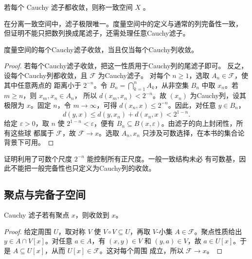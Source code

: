 \begin{definition}[完备一致空间]
若每个 Cauchy 滤子都收敛，则称一致空间 \(X\) 。
\end{definition}

在分离一致空间中，滤子极限唯一。度量空间中的定义与通常的列完备性一致，
但证明不能只把数列换成尾滤子，还需处理任意Cauchy滤子。

\begin{proposition}[度量空间的两种完备性定义]
\label{prop:metric-filter-completeness}
度量空间的每个Cauchy滤子收敛，当且仅当每个Cauchy列收敛。
\end{proposition}

\begin{proof}
若每个Cauchy滤子收敛，把这一性质用于Cauchy列的尾滤子即可。
反之，设每个Cauchy列都收敛，且 \(\mathcal F\) 为Cauchy滤子。
对每个 \(n\ge1\)，选取 \(A_n\in\mathcal F\)，使其中任意两点的
距离小于 \(2^{-n}\)。令 \(B_n=\bigcap_{k=1}^n A_k\)，从非空集
\(B_n\) 中取 \(x_n\)。若 \(m\ge n\)，则 \(x_m,x_n\in A_n\)，
所以 \(d(x_m,x_n)<2^{-n}\)。故 \((x_n)\) 为Cauchy列，设其极限为
\(x\)。固定 \(n\)，令 \(m\to\infty\)，可得
\(d(x_n,x)\le2^{-n}\)。因此，对任意 \(y\in B_n\)，
\[
 d(y,x)\le d(y,x_n)+d(x_n,x)<2^{1-n}.
\]
给定 \(\varepsilon>0\)，取 \(n\) 使 \(2^{1-n}<\varepsilon\)，便有
\(B_n\subseteq B(x,\varepsilon)\)。由滤子的向上封闭性，所有这些球
都属于 \(\mathcal F\)，故 \(\mathcal F\to x\)。选取 \(A_n,x_n\)
只涉及可数选择，在本书的集合论背景下可用。
\end{proof}

证明利用了可数个尺度 \(2^{-n}\) 能控制所有正尺度。一般一致结构未必
有可数基，因此不能把一般完备性也只定义为Cauchy列的收敛。

\subsection{聚点与完备子空间}

\begin{lemma}
\label{lem:cauchy-filter-cluster-limit}
Cauchy 滤子若有聚点 \(x\)，则收敛到 \(x\)。
\end{lemma}

\begin{proof}
给定周围 \(U\)，取对称 \(V\) 使 \(V\circ V\subseteq U\)，再取
\(V\)-小集 \(A\in\mathcal F\)。聚点性质给出
\(y\in A\cap V[x]\)。对任意 \(a\in A\)，有
\((x,y)\in V\) 和 \((y,a)\in V\)，故 \(a\in U[x]\)。于是
\(A\subseteq U[x]\)，从而 \(U[x]\in\mathcal F\)。这对每个周围
成立，所以 \(\mathcal F\to x\)。
\end{proof}

